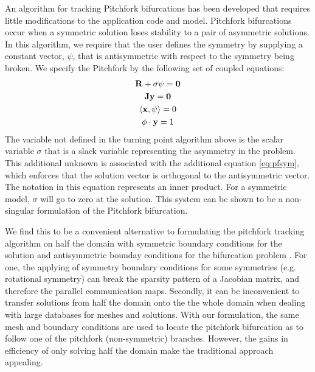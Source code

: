 An algorithm for tracking Pitchfork bifurcations has been developed that requires little modifications to the application code and model. Pitchfork bifurcations occur when a symmetric solution loses stability to a pair of asymmetric solutions. In this algorithm, we require that the user defines the symmetry by supplying a constant vector, $\psi$, that is antisymmetric with respect to the symmetry being broken. We specify the Pitchfork by the following set of coupled equations:
\begin{gather}
\label{eq:pf}
{\bf R} + \sigma \psi ={\bf 0} \\
{\bf J} {\bf y} = {\bf 0}\\
\langle {\bf x} , \psi \rangle = 0 \label{eq:pfsym} \\
\phi \cdot {\bf y} = 1 \label{eq:pfnorm}
\end{gather}
The variable not defined in the turning point algorithm above is the scalar variable $\sigma$ that is a slack variable representing the asymmetry in the problem. This additional unknown is associated with the additional equation \ref{eq:pfsym}, which enforces that the solution vector is orthogonal to the antisymmetric vector. The notation in this equation represents an inner product. For a symmetric model, $\sigma$ will go to zero at the solution. This system can be shown to be a non-singular formulation of the Pitchfork bifurcation.

We find this to be a convenient alternative to formulating the pitchfork tracking algorithm on half the domain with symmetric boundary conditions for the solution and antisymmetric bounday conditions for the bifurcation problem \cite{tavener01}. For one, the applying of symmetry boundary conditions for some
symmetries (e.g. rotational symmetry) can break the sparsity pattern of a Jacobian matrix, and therefore the parallel communication maps. Secondly, it can be inconvenient
to transfer solutions from half the domain onto the the whole domain when dealing with large databases for meshes and solutions. With our formulation, the same mesh and
boundary conditions are used to locate the pitchfork bifurcation as to follow one of the pitchfork (non-symmetric) branches. However, the gains in efficiency of only solving half the domain make the traditional approach appealing.

